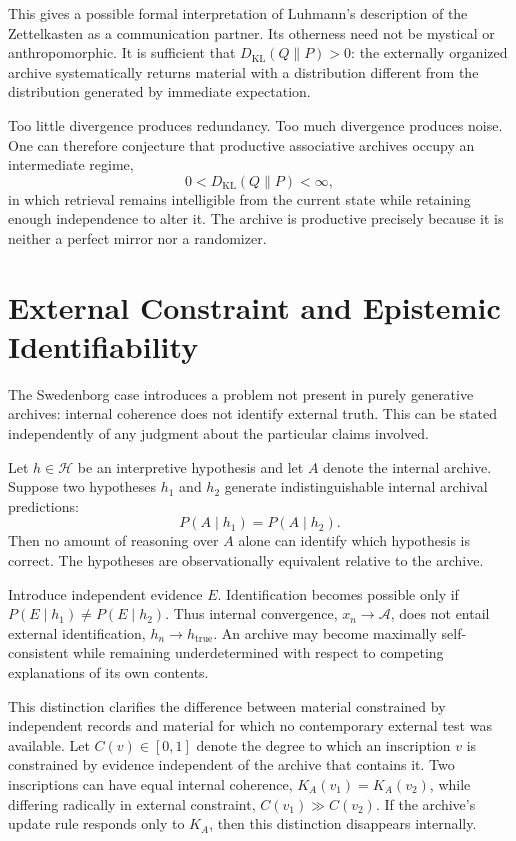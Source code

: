 \documentclass[11pt]{article}
\begin{document}
This gives a possible formal interpretation of Luhmann's description of the Zettelkasten as a communication partner. Its otherness need not be mystical or anthropomorphic. It is sufficient that $D_{\mathrm{KL}}(Q \| P) > 0$: the externally organized archive systematically returns material with a distribution different from the distribution generated by immediate expectation.

Too little divergence produces redundancy. Too much divergence produces noise. One can therefore conjecture that productive associative archives occupy an intermediate regime,
\[
0 < D_{\mathrm{KL}}(Q \| P) < \infty,
\]
in which retrieval remains intelligible from the current state while retaining enough independence to alter it. The archive is productive precisely because it is neither a perfect mirror nor a randomizer.

\section{External Constraint and Epistemic Identifiability}

The Swedenborg case introduces a problem not present in purely generative archives: internal coherence does not identify external truth. This can be stated independently of any judgment about the particular claims involved.

Let $h \in \mathcal{H}$ be an interpretive hypothesis and let $A$ denote the internal archive. Suppose two hypotheses $h_1$ and $h_2$ generate indistinguishable internal archival predictions:
\[
P(A \mid h_1) = P(A \mid h_2).
\]
Then no amount of reasoning over $A$ alone can identify which hypothesis is correct. The hypotheses are observationally equivalent relative to the archive.

Introduce independent evidence $E$. Identification becomes possible only if $P(E \mid h_1) \neq P(E \mid h_2)$. Thus internal convergence, $x_n \longrightarrow \mathcal{A}$, does not entail external identification, $h_n \longrightarrow h_{\mathrm{true}}$. An archive may become maximally self-consistent while remaining underdetermined with respect to competing explanations of its own contents.

This distinction clarifies the difference between material constrained by independent records and material for which no contemporary external test was available. Let $C(v) \in [0,1]$ denote the degree to which an inscription $v$ is constrained by evidence independent of the archive that contains it. Two inscriptions can have equal internal coherence, $K_A(v_1) = K_A(v_2)$, while differing radically in external constraint, $C(v_1) \gg C(v_2)$. If the archive's update rule responds only to $K_A$, then this distinction disappears internally.
\end{document}
